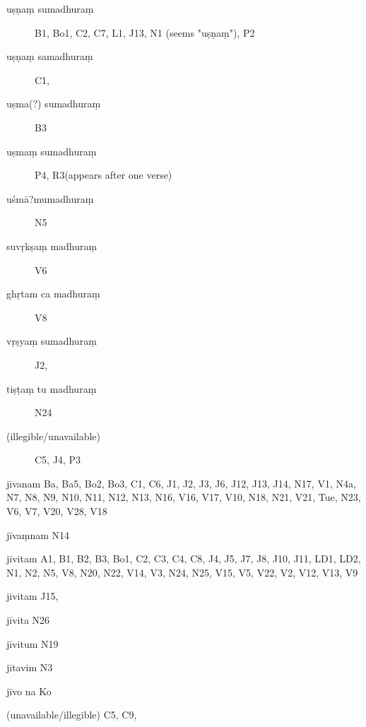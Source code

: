\begin{ekdosis}
\begin{marma}[hp01_055]
\begin{marma}[hp01_063]
\begin{description}
      \item[uṣṇaṃ sumadhuraṃ]        B1, Bo1, C2, C7, L1, J13, N1 (seems "uṣṇaṃ"), P2
      \item[uṣṇaṃ samadhuraṃ]        C1,
      \item[uṣma(?) sumadhuraṃ]        B3
      \item[uṣmaṃ sumadhuraṃ]        P4, R3(appears after one verse)
      \item[uśmā?mumadhuraṃ]  N5
      \item[suvṛkṣaṃ madhuraṃ]        V6
      \item[ghṛtam ca madhuraṃ]        V8
      \item[vṛṣyaṃ sumadhuraṃ]        J2,
      \item[tiṣṭaṃ tu madhuraṃ]  N24
      \item[(illegible/unavailable)]   C5, J4, P3
      \end{description}
    \end{marma}


    \begin{marma}[hp02_003]
    \item[jīvanam] Ba, Ba5, Bo2, Bo3, C1, C6, J1, J2, J3, J6, J12, J13, J14, N17, V1, N4a, N7, N8, N9, N10, N11, N12, N13, N16, V16, V17, V10, N18, N21, V21, Tue, N23, V6, V7, V20, V28, V18
    \item[jīvaṃnam] N14
    \item[jīvitam] A1, B1, B2, B3, Bo1, C2, C3, C4, C8, J4, J5, J7, J8, J10, J11, LD1, LD2, N1, N2, N5, V8, N20, N22, V14, V3, N24, N25, V15, V5, V22, V2, V12, V13, V9
    \item[jivitam] J15,
    \item[jīvita] N26
    \item[jīvitum] N19
    \item[jītavim] N3
    \item[jīvo na] Ko
    \item[(unavailable/illegible)] C5, C9, 

      \begin{description}

      \end{description}
    \end{marma}


\end{marma}
\end{ekdosis}
